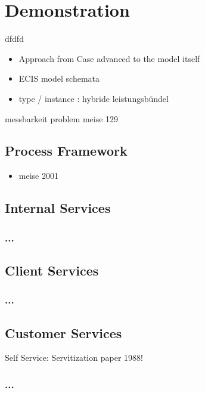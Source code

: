 
\chapter{Demonstration}
\label{chap:demo}
dfdfd
\begin{itemize}
	\item Approach from Case advanced to the model itself
	\item ECIS model schemata
	\item type / instance : hybride leistungsbündel
\end{itemize}

messbarkeit problem meise 129

	\section{Process Framework}
	\begin{itemize}
		\item meise 2001
	\end{itemize}
	\section{Internal Services}
	\subsection{...}
	\section{Client Services}
	\subsection{...}
	\section{Customer Services}
	Self Service: Servitization paper 1988!
	\subsection{...}
